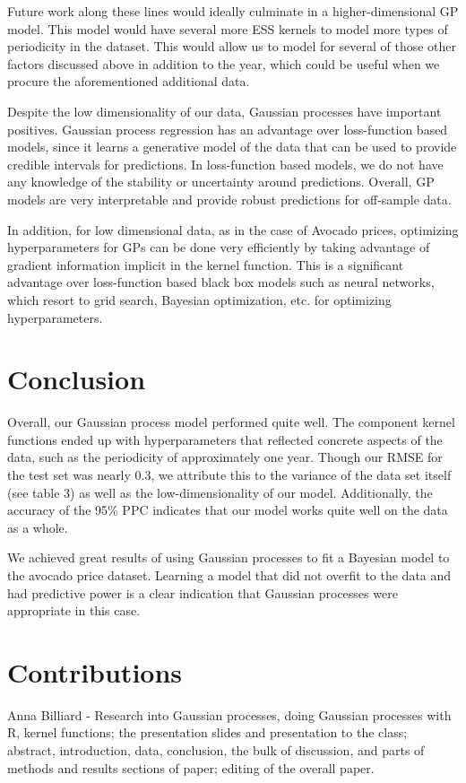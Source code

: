 \documentclass{article}
\begin{document}
Future work along these lines would ideally culminate in a higher-dimensional GP model. This model would have several more ESS kernels to model more types of periodicity in the dataset. This would allow us to model for several of those other factors discussed above in addition to the year, which could be useful when we procure the aforementioned additional data.

Despite the low dimensionality of our data, Gaussian processes have important positives. Gaussian process regression has an advantage over loss-function based models, since it learns a generative model of the data that can be used to provide credible intervals for predictions. In loss-function based models, we do not have any knowledge of the stability or uncertainty around predictions. Overall, GP models are very interpretable and provide robust predictions for off-sample data.

In addition, for low dimensional data, as in the case of Avocado prices, optimizing hyperparameters for GPs can be done very efficiently by taking advantage of gradient information implicit in the kernel function. This is a significant advantage over loss-function based black box models such as neural networks, which  resort to grid search, Bayesian optimization, etc. for optimizing hyperparameters.

\section{Conclusion}
    Overall, our Gaussian process model performed quite well. The component kernel functions ended up with hyperparameters that reflected concrete aspects of the data, such as the periodicity of approximately one year. Though our RMSE for the test set was nearly 0.3, we attribute this to the variance of the data set itself (see table 3) as well as the low-dimensionality of our model. Additionally, the accuracy of the 95\% PPC indicates that our model works quite well on the data as a whole.
    
    We achieved great results of using Gaussian processes to fit a Bayesian model to the avocado price dataset. Learning a model that did not overfit to the data and had predictive power is a clear indication that Gaussian processes were appropriate in this case. 
    
\section{Contributions}
    Anna Billiard - Research into Gaussian processes, doing Gaussian processes with R, kernel functions; the presentation slides and presentation to the class; abstract, introduction, data, conclusion, the bulk of discussion, and parts of methods and results sections of paper; editing of the overall paper.
    
\end{document}
